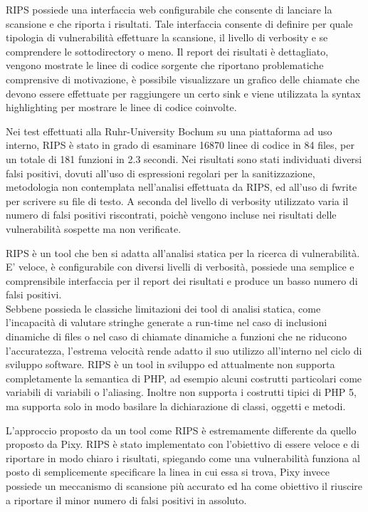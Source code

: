 RIPS possiede una interfaccia web configurabile che consente di lanciare la scansione e che riporta i risultati. Tale interfaccia consente di definire per quale tipologia di vulnerabilità effettuare la scansione, il livello di verbosity e se comprendere le sottodirectory o meno. Il report dei risultati è dettagliato, vengono mostrate le linee di codice sorgente che riportano problematiche comprensive di motivazione, è possibile visualizzare un grafico delle chiamate che devono essere effettuate per raggiungere un certo sink e viene utilizzata la syntax highlighting per mostrare le linee di codice coinvolte.

Nei test effettuati alla Ruhr-University Bochum su una piattaforma ad uso interno, RIPS è stato in grado di esaminare 16870 linee di codice in 84 files, per un totale di 181 funzioni in 2.3 secondi. Nei risultati sono stati individuati diversi falsi positivi, dovuti all'uso di espressioni regolari per la sanitizzazione, metodologia non contemplata nell'analisi effettuata da RIPS, ed all'uso di fwrite per scrivere su file di testo. A seconda del livello di verbosity utilizzato varia il numero di falsi positivi riscontrati, poichè vengono incluse nei risultati delle vulnerabilità sospette ma non verificate.

RIPS è un tool che ben si adatta all'analisi statica per la ricerca di vulnerabilità. E' veloce, è configurabile con diversi livelli di verbosità, possiede una semplice e comprensibile interfaccia per il report dei risultati e produce un basso numero di falsi positivi.\\
Sebbene possieda le classiche limitazioni dei tool di analisi statica, come l'incapacità di valutare stringhe generate a run-time nel caso di inclusioni dinamiche di files o nel caso di chiamate dinamiche a funzioni che ne riducono l'accuratezza, l'estrema velocità rende adatto il suo utilizzo all'interno nel ciclo di sviluppo software.
RIPS è un tool in sviluppo ed attualmente non supporta completamente la semantica di PHP, ad esempio alcuni costrutti particolari come variabili di variabili o l'aliasing. Inoltre non supporta i costrutti tipici di PHP 5, ma supporta solo in modo basilare la dichiarazione di classi, oggetti e metodi.

L'approccio proposto da un tool come RIPS è estremamente differente da quello proposto da Pixy. RIPS è stato implementato con l'obiettivo di essere veloce e di riportare in modo chiaro i risultati, spiegando come una vulnerabilità funziona al posto di semplicemente specificare la linea in cui essa si trova, Pixy invece possiede un meccanismo di scansione più accurato ed ha come obiettivo il riuscire a riportare il minor numero di falsi positivi in assoluto.

